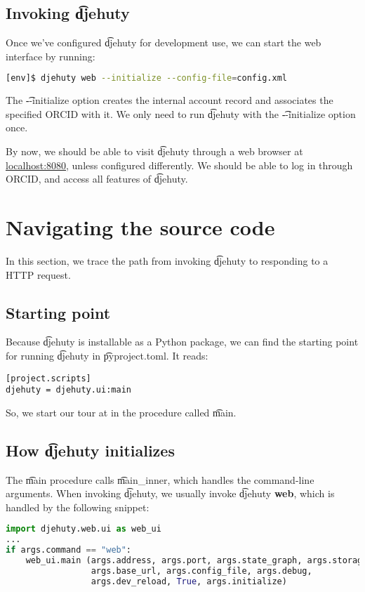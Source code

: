 \subsection{Invoking \t{djehuty}}

Once we've configured \t{djehuty} for development use, we can start the web
interface by running:

\begin{lstlisting}[language=bash]
[env]$ djehuty web --initialize --config-file=config.xml
\end{lstlisting}

The \t{-{}-initialize} option creates the internal account record and
associates the specified ORCID with it.  We only need to run \t{djehuty}
with the \t{-{}-initialize} option once.

By now, we should be able to visit \t{djehuty} through a web browser at
\href{http://127.0.0.1:8080}{localhost:8080}, unless configured differently.
We should be able to log in through ORCID, and access all features of
\t{djehuty}.

\section{Navigating the source code}

In this section, we trace the path from invoking \t{djehuty} to responding
to a HTTP request.

\subsection{Starting point}
Because \t{djehuty} is installable as a Python package, we can find the
starting point for running \t{djehuty} in \t{pyproject.toml}.  It reads:
\begin{lstlisting}
[project.scripts]
djehuty = djehuty.ui:main
\end{lstlisting}

So, we start our tour at  in the procedure called \t{main}.

\subsection{How \t{djehuty} initializes}

The \t{main} procedure calls \t{main\_inner}, which handles the command-line
arguments.  When invoking \t{djehuty}, we usually invoke
\t{djehuty \textbf{web}}, which is handled by the following snippet:
\begin{lstlisting}[language=python]
import djehuty.web.ui as web_ui
...
if args.command == "web":
    web_ui.main (args.address, args.port, args.state_graph, args.storage,
                 args.base_url, args.config_file, args.debug,
                 args.dev_reload, True, args.initialize)
\end{lstlisting}

